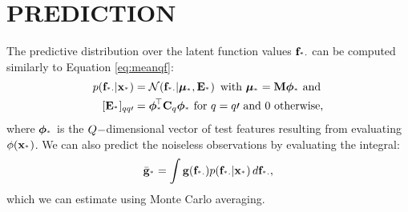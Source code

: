 \section{PREDICTION}
The predictive distribution over the latent function values $\mathbf{f}_{^{*} \cdot}$ can be 
computed similarly to Equation \eqref{eq:meanqf}:
\begin{align}
\probC{\latentstest}{   \ins_{\test} } &= \gausC{\latentstest}{\muftest, \covftest} \text{ with }
\muftest= \pWeights \featstest  \text{ and}\\
[\covftest]_{qq\prime}  &=  \featstest\transpose  \pocov_q \featstest \text{ for } q = q\prime \text{  and } 0 \text{ otherwise,} 
\end{align}
where $\boldsymbol\phi_{^{*}}$ is the $Q-$dimensional vector of test features resulting from evaluating $\phi\!\left({{\mathbf{x}_{^{*}}}}\right)$.
%
We can also predict the noiseless observations by evaluating the  integral:
\begin{equation}
  \bar{\mathbf{g}}_{^{*}} =  \int \mathbf{g}(\mathbf{f}_{^{*} \cdot})  p\!\left({\mathbf{f}_{^{*} \cdot}}\middle\vert{   \ensuremath{\mathbf{x}}_{\ensuremath{^{*}}} }\right) d \mathbf{f}_{^{*} \cdot} \text{,}
 \end{equation}
which we can estimate using Monte Carlo averaging. 
